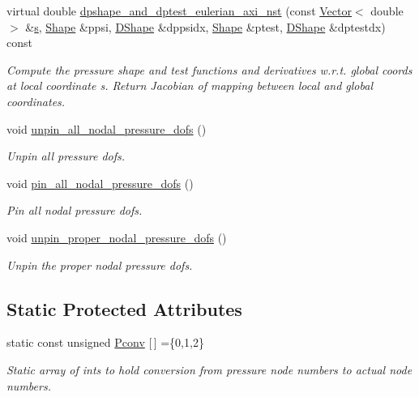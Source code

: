 \begin{DoxyCompactItemize}
virtual double \hyperlink{classoomph_1_1AxisymmetricTTaylorHoodElement_a97c4e14f4e7af5728c55b145d946a1fb}{dpshape\+\_\+and\+\_\+dptest\+\_\+eulerian\+\_\+axi\+\_\+nst} (const \hyperlink{classoomph_1_1Vector}{Vector}$<$ double $>$ \&\hyperlink{cfortran_8h_ab7123126e4885ef647dd9c6e3807a21c}{s}, \hyperlink{classoomph_1_1Shape}{Shape} \&ppsi, \hyperlink{classoomph_1_1DShape}{D\+Shape} \&dppsidx, \hyperlink{classoomph_1_1Shape}{Shape} \&ptest, \hyperlink{classoomph_1_1DShape}{D\+Shape} \&dptestdx) const
\begin{DoxyCompactList}\small\item\em Compute the pressure shape and test functions and derivatives w.\+r.\+t. global coords at local coordinate s. Return Jacobian of mapping between local and global coordinates. \end{DoxyCompactList}\item 
void \hyperlink{classoomph_1_1AxisymmetricTTaylorHoodElement_a008b24e28c97a15ccc634ce6fa76a0c2}{unpin\+\_\+all\+\_\+nodal\+\_\+pressure\+\_\+dofs} ()
\begin{DoxyCompactList}\small\item\em Unpin all pressure dofs. \end{DoxyCompactList}\item 
void \hyperlink{classoomph_1_1AxisymmetricTTaylorHoodElement_ab340da6c7f125bba62b3234993890cd0}{pin\+\_\+all\+\_\+nodal\+\_\+pressure\+\_\+dofs} ()
\begin{DoxyCompactList}\small\item\em Pin all nodal pressure dofs. \end{DoxyCompactList}\item 
void \hyperlink{classoomph_1_1AxisymmetricTTaylorHoodElement_abf71bcb109d1e5ee51b621f9287cd486}{unpin\+\_\+proper\+\_\+nodal\+\_\+pressure\+\_\+dofs} ()
\begin{DoxyCompactList}\small\item\em Unpin the proper nodal pressure dofs. \end{DoxyCompactList}\end{DoxyCompactItemize}
\subsection*{Static Protected Attributes}
\begin{DoxyCompactItemize}
\item 
static const unsigned \hyperlink{classoomph_1_1AxisymmetricTTaylorHoodElement_a0aeec7081602d00fd711fd9d0b2022b9}{Pconv} \mbox{[}$\,$\mbox{]} =\{0,1,2\}
\begin{DoxyCompactList}\small\item\em Static array of ints to hold conversion from pressure node numbers to actual node numbers. \end{DoxyCompactList}\end{DoxyCompactItemize}
